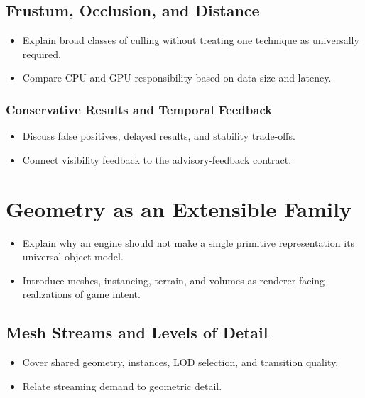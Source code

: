 \documentclass[
  11pt,
  letterpaper,
  DIV=11,
  numbers=noendperiod,
  twoside,
  open=right]{scrreprt}
\providecommand{\tightlist}{%
  \setlength{\itemsep}{0pt}\setlength{\parskip}{0pt}}
\begin{document}
\subsection{Frustum, Occlusion, and
Distance}\label{frustum-occlusion-and-distance}

\begin{itemize}
\tightlist
\item
  Explain broad classes of culling without treating one technique as
  universally required.
\item
  Compare CPU and GPU responsibility based on data size and latency.
\end{itemize}

\subsubsection{Conservative Results and Temporal
Feedback}\label{conservative-results-and-temporal-feedback}

\begin{itemize}
\tightlist
\item
  Discuss false positives, delayed results, and stability trade-offs.
\item
  Connect visibility feedback to the advisory-feedback contract.
\end{itemize}

\section{Geometry as an Extensible
Family}\label{geometry-as-an-extensible-family}

\begin{itemize}
\tightlist
\item
  Explain why an engine should not make a single primitive
  representation its universal object model.
\item
  Introduce meshes, instancing, terrain, and volumes as renderer-facing
  realizations of game intent.
\end{itemize}

\subsection{Mesh Streams and Levels of
Detail}\label{mesh-streams-and-levels-of-detail}

\begin{itemize}
\tightlist
\item
  Cover shared geometry, instances, LOD selection, and transition
  quality.
\item
  Relate streaming demand to geometric detail.
\end{itemize}
\end{document}
